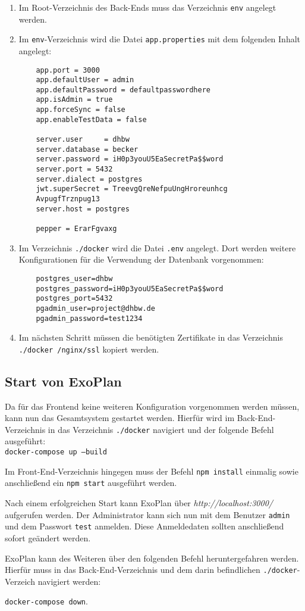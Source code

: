 \begin{enumerate}
	\item Im Root-Verzeichnis des Back-Ends muss das Verzeichnis \texttt{env} angelegt werden.
	\item Im \texttt{env}-Verzeichnis wird die Datei \texttt{app.properties} mit dem folgenden Inhalt angelegt:
	\begin{lstlisting}
	app.port = 3000
	app.defaultUser = admin
	app.defaultPassword = defaultpasswordhere
	app.isAdmin = true
	app.forceSync = false
	app.enableTestData = false
	
	server.user     = dhbw
	server.database = becker
	server.password = iH0p3youU5EaSecretPa$$word
	server.port = 5432
	server.dialect = postgres
	jwt.superSecret = TreevgQreNefpuUngHroreunhcg
	AvpugfTrznpug13
	server.host = postgres
	
	pepper = ErarFgvaxg
	\end{lstlisting}
	
	\item Im Verzeichnis \texttt{./docker} wird die Datei \texttt{.env} angelegt. Dort werden weitere Konfigurationen für die Verwendung der Datenbank vorgenommen:
	
	\begin{lstlisting}
	postgres_user=dhbw
	postgres_password=iH0p3youU5EaSecretPa$$word
	postgres_port=5432
	pgadmin_user=project@dhbw.de
	pgadmin_password=test1234
	\end{lstlisting}
	
	\item Im nächsten Schritt müssen die benötigten Zertifikate in das Verzeichnis \texttt{./docker
		/nginx/ssl} kopiert werden.
	
\end{enumerate}

\subsection{Start von ExoPlan}

Da für das Frontend keine weiteren Konfiguration vorgenommen werden müssen, kann nun das Gesamtsystem gestartet werden. 
Hierfür wird im Back-End-Verzeichnis in das Verzeichnis \texttt{./docker} navigiert und der folgende Befehl ausgeführt:\\ 
\texttt{docker-compose up --build}

Im Front-End-Verzeichnis hingegen muss der Befehl \texttt{npm install} einmalig sowie anschließend ein \texttt{npm start} ausgeführt werden.

Nach einem erfolgreichen Start kann ExoPlan über \textit{http://localhost:3000/} aufgerufen werden. 
Der Administrator kann sich nun mit dem Benutzer \texttt{admin} und dem Passwort \texttt{test} anmelden. Diese Anmeldedaten sollten anschließend sofort geändert werden.

ExoPlan kann des Weiteren über den folgenden Befehl heruntergefahren werden. 
Hierfür muss in das Back-End-Verzeichnis und dem darin befindlichen \texttt{./docker}-Verzeich navigiert werden:

\texttt{docker-compose down}.